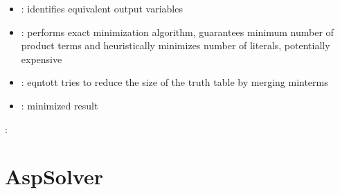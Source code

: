 \documentclass[letterpaper,10pt,english]{sphinxmanual}
\begin{document}
\begin{fulllineitems}
\begin{description}
\begin{itemize}
\item {} 
: identifies equivalent output variables

\item {} 
: performs exact minimization algorithm, guarantees minimum number of product terms and heuristically minimizes number of literals, potentially expensive

\item {} 
: eqntott tries to reduce the size of the truth table by merging minterms

\end{itemize}

\item[{\sphinxstylestrong{returns}:}] \leavevmode\begin{itemize}
\item {} 
: minimized result

\end{itemize}

\end{description}

:

\begin{sphinxVerbatim}[commandchars=\\\{\}]
    
  
  
  
\end{sphinxVerbatim}

\end{fulllineitems}



\section{AspSolver}
\label{\detokenize{AspSolver:aspsolver}}\label{\detokenize{AspSolver::doc}}\label{\detokenize{AspSolver:id1}}
\end{document}
